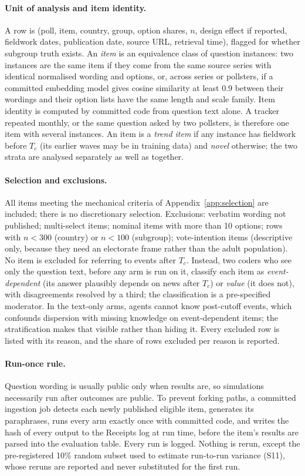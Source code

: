 \documentclass[11pt]{article}
\begin{document}
\paragraph{Unit of analysis and item identity.} A row is (poll, item, country, group, option shares, $n$, design effect if reported, fieldwork dates, publication date, source URL, retrieval time), flagged for whether subgroup truth exists. An \emph{item} is an equivalence class of question instances: two instances are the same item if they come from the same source series with identical normalised wording and options, or, across series or pollsters, if a committed embedding model gives cosine similarity at least 0.9 between their wordings and their option lists have the same length and scale family. Item identity is computed by committed code from question text alone. A tracker repeated monthly, or the same question asked by two pollsters, is therefore one item with several instances. An item is a \emph{trend item} if any instance has fieldwork before $T_c$ (its earlier waves may be in training data) and \emph{novel} otherwise; the two strata are analysed separately as well as together.

\paragraph{Selection and exclusions.} All items meeting the mechanical criteria of Appendix~\ref{app:selection} are included; there is no discretionary selection. Exclusions: verbatim wording not published; multi-select items; nominal items with more than 10 options; rows with $n<300$ (country) or $n<100$ (subgroup); vote-intention items (descriptive only, because they need an electorate frame rather than the adult population). No item is excluded for referring to events after $T_c$. Instead, two coders who see only the question text, before any arm is run on it, classify each item as \emph{event-dependent} (its answer plausibly depends on news after $T_c$) or \emph{value} (it does not), with disagreements resolved by a third; the classification is a pre-specified moderator. In the text-only arms, agents cannot know post-cutoff events, which confounds dispersion with missing knowledge on event-dependent items; the stratification makes that visible rather than hiding it. Every excluded row is listed with its reason, and the share of rows excluded per reason is reported.

\paragraph{Run-once rule.} Question wording is usually public only when results are, so simulations necessarily run after outcomes are public. To prevent forking paths, a committed ingestion job detects each newly published eligible item, generates its paraphrases, runs every arm exactly once with committed code, and writes the hash of every output to the Receipts log at run time, before the item's results are parsed into the evaluation table. Every run is logged. Nothing is rerun, except the pre-registered 10\% random subset used to estimate run-to-run variance (S11), whose reruns are reported and never substituted for the first run.
\end{document}
